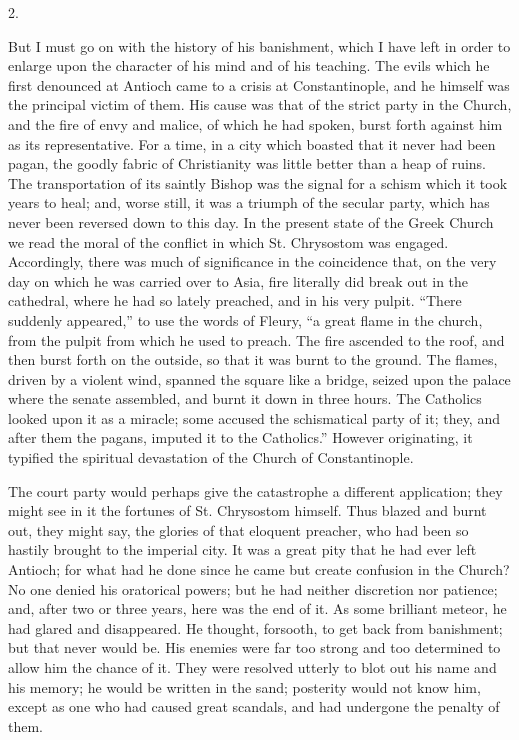 2.

But I must go on with the history of his banishment, which I have
left in order to enlarge upon the character of his mind and of his
teaching. The evils which he first denounced at Antioch came to a
crisis at Constantinople, and he himself was the principal victim of
them. His cause was that of the strict party in the Church, and
the fire of envy and malice, of which he had spoken, burst forth
against him as its representative. For a time, in a city which boasted
that it never had been pagan, the goodly fabric of Christianity was
little better than a heap of ruins. The transportation of its saintly
Bishop was the signal for a schism which it took years to heal; and,
worse still, it was a triumph of the secular party, which has never
been reversed down to this day. In the present state of the Greek
Church we read the moral of the conflict in which St. Chrysostom was
engaged. Accordingly, there was much of significance in the
coincidence that, on the very day on which he was carried over to
Asia, fire literally did break out in the cathedral, where he had so
lately preached, and in his very pulpit. ``There suddenly
appeared,'' to use the words of Fleury, ``a great flame in the
church, from the pulpit from which he used to preach. The fire
ascended to the roof, and then burst forth on the outside, so that it
was burnt to the ground. The flames, driven by a violent wind, spanned
the square like a bridge, seized upon the palace where the senate
assembled, and burnt it down in three hours. The Catholics looked upon
it as a miracle; some accused the schismatical party of it; they, and
after them the pagans, imputed it to the Catholics.'' However
originating, it typified the spiritual devastation of the Church of
Constantinople.

The court party would perhaps give the catastrophe a different
application; they might see in it the fortunes of St. Chrysostom
himself. Thus blazed and burnt out, they might say, the glories of
that eloquent preacher, who had been so hastily brought to the
imperial city. It was a great pity that he had ever left Antioch; for
what had he done since he came but create confusion in the Church? No
one denied his oratorical powers; but he had neither discretion
nor patience; and, after two or three years, here was the end of it.
As some brilliant meteor, he had glared and disappeared. He thought,
forsooth, to get back from banishment; but that never would be. His
enemies were far too strong and too determined to allow him the chance
of it. They were resolved utterly to blot out his name and his memory;
he would be written in the sand; posterity would not know him, except
as one who had caused great scandals, and had undergone the penalty of
them.

